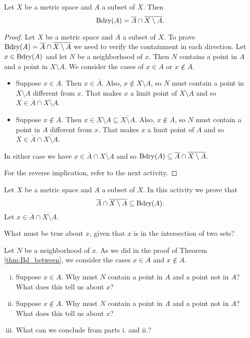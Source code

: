 \begin{theorem} \label{thm:Bd_between} Let $X$ be a metric space and $A$ a subset of $X$. Then
\[\text{Bdry}(A) = \overline{A} \cap \overline{X \setminus A}.\]
\end{theorem}

\begin{proof} Let $X$ be a metric space and $A$ a subset of $X$. To prove $\text{Bdry}(A) = \overline{A} \cap \overline{X \setminus A}$ we need to verify the containment in each direction. Let $x \in \text{Bdry}(A)$ and let $N$ be a neighborhood of $x$. Then $N$ contains a point in $A$ and a point in $X \setminus A$. We consider the cases of $x \in A$ or $x \notin A$. 
\begin{itemize}
\item Suppose $x \in A$. Then $x \in \overline{A}$. Also, $x \notin X \setminus A$, so $N$ must contain a point in $X \setminus A$ different from $x$. That makes $x$ a limit point of $X \setminus A$ and so $X \in \overline{A} \cap \overline{X \setminus A}$. 
\item Suppose $x \notin A$. Then $x \in X \setminus A \subseteq \overline{X \setminus A}$. Also, $x \notin A$, so $N$ must contain a point in $A$ different from $x$. That makes $x$ a limit point of $A$ and so $X \in \overline{A} \cap \overline{X \setminus A}$. 
\end{itemize}
In either case we have $x \in \overline{A} \cap \overline{X \setminus A}$ and so $\text{Bdry}(A) \subseteq \overline{A} \cap \overline{X \setminus A}$.

For the reverse implication, refer to the next activity.

\end{proof}


\begin{activity} Let $X$ be a metric space and $A$ a subset of $X$. In this activity we prove that 
\[\overline{A} \cap \overline{X \setminus A} \subseteq \text{Bdry}(A).\]
Let $x \in \overline{A} \cap \overline{X \setminus A}$.
\ba
\item What must be true about $x$, given that $x$ is in the intersection of two sets?

\item Let $N$ be a neighborhood of $x$. As we did in the proof of Theorem \ref{thm:Bd_between}, we consider the cases $x \in A$ and $x \notin A$. 
	\begin{enumerate}[i.]
	\item Suppose $x \in A$. Why must $N$ contain a point in $A$ and a point not in $A$? What does this tell us about $x$?
		
	\item Suppose $x \notin A$. Why must $N$ contain a point in $A$ and a point not in $A$? What does this tell us about $x$?
		
	\item What can we conclude from parts i. and ii.?
		
	\end{enumerate}

\ea

\end{activity}


